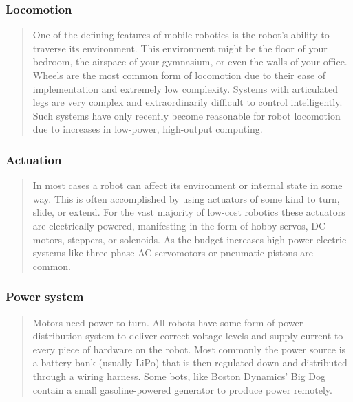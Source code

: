 \hypertarget{locomotion}{%
\subsubsection{Locomotion}\label{locomotion}}

\begin{quote}
One of the defining features of mobile robotics is the robot's ability
to traverse its environment. This environment might be the floor of your
bedroom, the airspace of your gymnasium, or even the walls of your
office. Wheels are the most common form of locomotion due to their ease
of implementation and extremely low complexity. Systems with articulated
legs are very complex and extraordinarily difficult to control
intelligently. Such systems have only recently become reasonable for
robot locomotion due to increases in low-power, high-output computing.
\end{quote}

\hypertarget{actuation}{%
\subsubsection{Actuation}\label{actuation}}

\begin{quote}
In most cases a robot can affect its environment or internal state in
some way. This is often accomplished by using actuators of some kind to
turn, slide, or extend. For the vast majority of low-cost robotics these
actuators are electrically powered, manifesting in the form of hobby
servos, DC motors, steppers, or solenoids. As the budget increases
high-power electric systems like three-phase AC servomotors or pneumatic
pistons are common.
\end{quote}

\hypertarget{power-system}{%
\subsubsection{Power system}\label{power-system}}

\begin{quote}
Motors need power to turn. All robots have some form of power
distribution system to deliver correct voltage levels and supply current
to every piece of hardware on the robot. Most commonly the power source
is a battery bank (usually LiPo) that is then regulated down and
distributed through a wiring harness. Some bots, like Boston Dynamics'
Big Dog contain a small gasoline-powered generator to produce power
remotely.
\end{quote}

